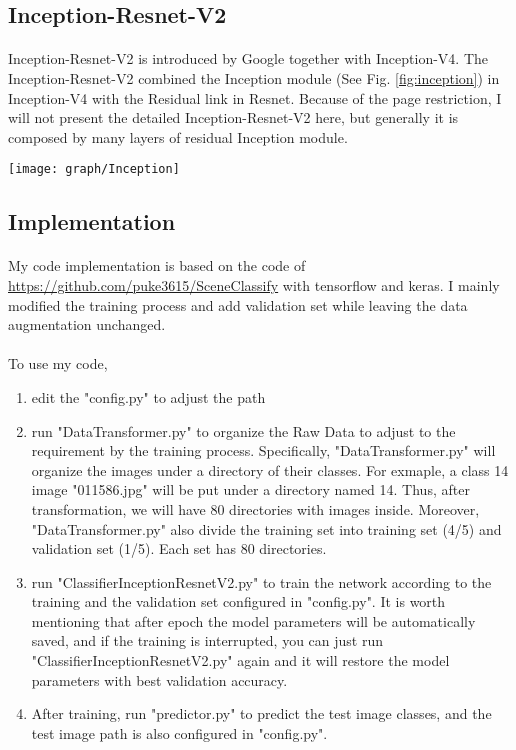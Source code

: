 \documentclass{gapd}
\begin{document}
\subsection{Inception-Resnet-V2}
\paragraph{}
	Inception-Resnet-V2 \cite{szegedy2017inception} is introduced by Google together with Inception-V4. The Inception-Resnet-V2 combined the Inception module (See Fig. \ref{fig:inception}) in Inception-V4 with the Residual link in Resnet. Because of the page restriction, I will not present the detailed Inception-Resnet-V2 here, but generally it is composed by many layers of residual Inception module. 
		
\begin{figure*}[htb]
	\centering
	\texttt{[image: graph/Inception]}
	\caption{Inception}
	\label{fig:inception}
\end{figure*}

\subsection{Implementation}
\paragraph{}
	My code implementation is based on the code of \href{https://github.com/puke3615/SceneClassify}{https://github.com/puke3615/SceneClassify} with tensorflow and keras. I mainly modified the training process and add validation set while leaving the data augmentation unchanged. 
\paragraph{}
	To use my code, 
	\begin{enumerate}
		\item edit the "config.py" to adjust the path
		\item run "DataTransformer.py" to organize the Raw Data to adjust to the requirement by the training process. Specifically, "DataTransformer.py" will organize the images under a directory of their classes. For exmaple, a class 14 image "011586.jpg" will be put under a directory named 14. Thus, after transformation, we will have 80 directories with images inside. Moreover, "DataTransformer.py" also divide the training set into training set (4/5) and validation set (1/5). Each set has 80 directories. 
		\item run "ClassifierInceptionResnetV2.py" to train the network according to the training and the validation set configured in "config.py". It is worth mentioning that after epoch the model parameters will be automatically saved, and if the training is interrupted, you can just run "ClassifierInceptionResnetV2.py" again and it will restore the model parameters with best validation accuracy. 
		\item After training, run "predictor.py" to predict the test image classes, and the test image path is also configured in "config.py". 
	\end{enumerate}
	
\end{document}
